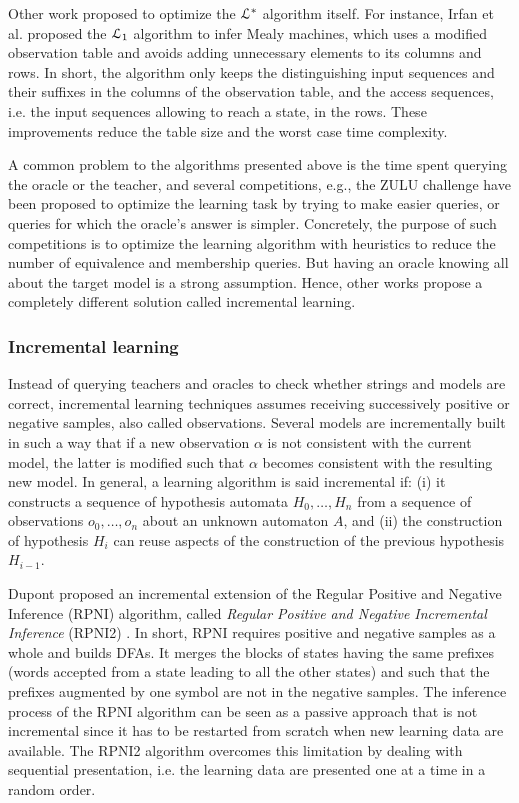 Other work proposed to optimize the $\EuScript{L}^*$ algorithm
itself. For instance, Irfan et al. proposed the $\EuScript{L}_1$
algorithm \cite{irfan12} to infer Mealy machines, which uses a
modified observation table and avoids adding unnecessary elements
to its columns and rows. In short, the algorithm only keeps the
distinguishing input sequences and their suffixes in the columns
of the observation table, and the access sequences, i.e. the
input sequences allowing to reach a state, in the rows. These
improvements reduce the table size and the worst case time
complexity.

A common problem to the algorithms presented above is the time
spent querying the oracle or the teacher, and several
competitions, e.g., the ZULU challenge \cite{zulu} have been
proposed to optimize the learning task by trying to make easier
queries, or queries for which the oracle's answer is simpler.
Concretely, the purpose of such competitions is to optimize the
learning algorithm with heuristics to reduce the number of
equivalence and membership queries. But having an oracle knowing
all about the target model is a strong assumption. Hence, other
works propose a completely different solution called incremental
learning.

\subsubsection{Incremental learning}
\label{sec:active-increment}

Instead of querying teachers and oracles to check whether strings
and models are correct, incremental learning techniques assumes
receiving successively positive or negative samples, also called
observations. Several models are incrementally built in such a
way that if a new observation $\alpha$ is not consistent with the
current model, the latter is modified such that $\alpha$ becomes
consistent with the resulting new model.  In general, a learning
algorithm is said incremental if: (i) it constructs a sequence of
hypothesis automata $H_0, \dots, H_n$ from a sequence of
observations $o_0, \dots, o_n$  about an unknown automaton $A$,
and (ii) the construction of hypothesis $H_i$ can reuse aspects
of the construction of the previous hypothesis $H_{i-1}$.

Dupont proposed an incremental extension of the Regular Positive
and Negative Inference (RPNI) algorithm, called \textit{Regular
Positive and Negative Incremental Inference} (RPNI2)
\cite{Dupont96incrementalregular}. In short, RPNI requires
positive and negative samples as a whole and builds DFAs. It
merges the blocks of states having the same prefixes (words
accepted from a state leading to all the other states) and such
that the prefixes augmented by one symbol are not in the negative
samples. The inference process of the RPNI algorithm can be seen
as a passive approach that is not incremental since it has to
be restarted from scratch when new learning data are available.
The RPNI2 algorithm overcomes this limitation by dealing with
sequential presentation, i.e. the learning data are presented one
at a time in a random order.

